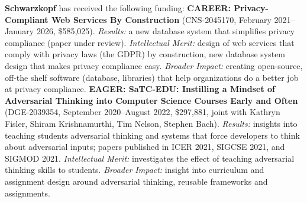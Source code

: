 \textbf{Schwarzkopf} has received the following funding:
%
\textbf{CAREER: Privacy-Compliant Web Services By Construction} (CNS-2045170, February 2021--January 2026, \$585,025).
%
\emph{Results:} a new database system that simplifies privacy compliance
(paper under review).
%
\emph{Intellectual Merit:} design of web services that comply with privacy
laws (\eg the GDPR) by construction, new database system design that makes
privacy compliance easy.
%
\emph{Broader Impact:} creating open-source, off-the shelf software
(database, libraries) that help organizations do a better job at privacy
compliance.
%
\textbf{EAGER: SaTC-EDU: Instilling a Mindset of Adversarial Thinking into
Computer Science Courses Early and Often} (DGE-2039354,
September 2020--August 2022, \$297,881, joint with Kathryn Fisler, Shiram
Krishnamurthi, Tim Nelson, Stephen Bach).
%
\emph{Results:} insights into teaching students adversarial thinking and
systems that force developers to think about adversarial inputs; papers
published in ICER 2021, SIGCSE 2021, and SIGMOD 2021.
%
\emph{Intellectual Merit:} investigates the effect of teaching adversarial
thinking skills to students.
%
\emph{Broader Impact:} insight into curriculum and assignment design
around adversarial thinking, reusable frameworks and assignments.
%
